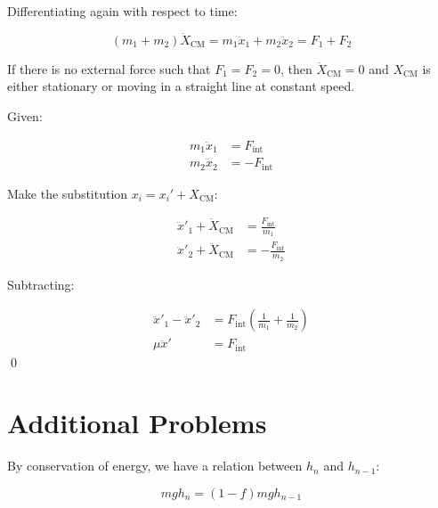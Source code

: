 \documentclass[12pt]{article}
\begin{document}

Differentiating again with respect to time:

\begin{equation}
    (m_{1} + m_{2}) \ddot{X}_{\text{CM}} = m_{1} \ddot{x}_{1} + m_{2} \ddot{x}_{2} = F_{1} + F_{2}
\end{equation}

If there is no external force such that $F_{1} = F_{2} = 0$, then $\ddot{X}_{\text{CM}} = 0$ and $X_{\text{CM}}$ is either stationary or moving in a straight line at constant speed.


Given:

\begin{equation}
\begin{split}
    m_{1} \ddot{x}_{1} &= F_{\text{int}} \\
    m_{2} \ddot{x}_{2} &= -F_{\text{int}}
\end{split}
\end{equation}

Make the substitution $x_{i} = x_{i}' + X_{\text{CM}}$:

\begin{equation}
\begin{split}
    \ddot{x}'_{1} + \ddot{X}_{\text{CM}} &= \frac{F_{\text{int}}}{m_{1}} \\
    \ddot{x}'_{2} + \ddot{X}_{\text{CM}} &= -\frac{F_{\text{int}}}{m_{2}}
\end{split}
\end{equation}

Subtracting:

\begin{equation}
\begin{split}
    \ddot{x}'_{1} - \ddot{x}'_{2} &= F_{\text{int}} \left( \frac{1}{m_{1}} + \frac{1}{m_{2}} \right) \\
    \mu \ddot{x}' &= F_{\text{int}}
\end{split}
\end{equation}
\qed


\pagebreak
\section*{Additional Problems}


By conservation of energy, we have a relation between $h_{n}$ and $h_{n-1}$:

\begin{equation}
    mg h_{n} = (1 - f) mg h_{n-1}
\end{equation}
\end{document}
